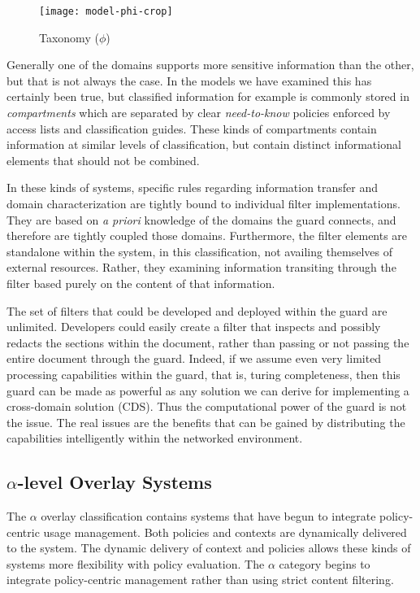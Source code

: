\begin{figure}[!t]
\centering
\texttt{[image: model-phi-crop]}
\caption{Taxonomy ($\phi$)}
\label{fig:model:taxonomy-phi}
\end{figure}

Generally one of the domains supports more sensitive information than the other, but that is not always the case.  In the models we have examined this has certainly been true, but classified information for example  is commonly stored in \textit{compartments} which are separated by clear \textit{need-to-know} policies enforced by access lists and classification guides.  These kinds of compartments contain information at similar levels of classification, but contain distinct informational elements that should not be combined.

In these kinds of systems, specific rules regarding information transfer and domain characterization are tightly bound to individual filter implementations.  They are based on \textit{a priori} knowledge of the domains the guard connects, and therefore are tightly coupled those domains.  Furthermore, the filter elements are standalone within the system, in this classification, not availing themselves of external resources.  Rather, they examining information transiting through the filter based purely on the content of that information.

The set of filters that could be developed and deployed within the guard are unlimited.  Developers could easily create a filter that inspects and possibly redacts the sections within the document, rather than passing or not passing the entire document through the guard.  Indeed, if we assume even very limited processing capabilities within the guard, that is, turing completeness, then this guard can be made as powerful as any solution we can derive for implementing a cross-domain solution (CDS). Thus the computational power of the guard is not the issue. The real issues are the benefits that can be gained by distributing the capabilities intelligently within the networked environment.

\subsection{$\alpha$-level Overlay Systems}
The $\alpha$ overlay classification contains systems that have begun to integrate policy-centric usage management. Both policies and contexts are dynamically delivered to the system. The dynamic delivery of context and policies allows these kinds of systems more flexibility with policy evaluation. The $\alpha$ category begins to integrate policy-centric management rather than using strict content filtering.

